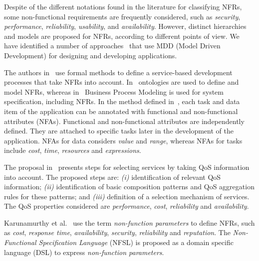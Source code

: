 Despite of the different notations found in the literature for classifying NFRs, some non-functional requirements are frequently considered, such as \textit{security}, \textit{performance}, \textit{reliability}, \textit{usability}, and \textit{availability}.
However, distinct hierarchies and models are proposed for NFRs,  according to different points of view.
We have identified a number of approaches~\cite{DAmbrogio06,CholletL09,SchmelingCM11,BasinDL06,Fabra2011,OvaskaEHPA10} that use MDD (Model Driven Development) for designing and developing applications. 

The authors in~\cite{ThissenW06,ZhangPSP05} use formal methods to define a service-based development processes that take NFRs into account. 
In~\cite{AgarwalLS09,PastranaPK11} ontologies are used to define and model NFRs, 
whereas in~\cite{XiaoCZBOLH08,GutierrezRF10} Business Process Modeling is used for
system specification, including NFRs. 
In the method defined in~\cite{XiaoCZBOLH08}, each task and data item of the application can be 
annotated with functional and non-functional attributes (NFAs). 
Functional and non-functional attributes are independently defined.
They are attached to specific tasks later in the development of the application. 
NFAs for data considers \textit{value} and \textit{range}, whereas NFAs for tasks include \textit{cost}, \textit{time}, \textit{resources} and \textit{expressions}.

The proposal in~\cite{ThissenW06} presents steps for  selecting services 
by taking QoS information into account. The proposed steps are: 
\textit{(i)} identification of relevant QoS information; 
\textit{(ii)} identification of basic composition patterns and 
QoS aggregation rules for these patterns; and 
\textit{(iii)} definition of a selection mechanism of services. 
The QoS properties considered are \textit{performance}, \textit{cost}, \textit{reliability} and
\textit{availability}. 
  
Karunamurthy et al.~\cite{Karunamurthy2012787} use the term \textit{non-function parameters} to define NFRs, such as \textit{cost}, \textit{response time}, \textit{availability}, \textit{security}, \textit{reliability} and \textit{reputation}.  
The \textit{Non-Func\-tion\-al Specification Language} (NFSL) is proposed as a domain specific language (DSL) to express \textit{non-function parameters}.

